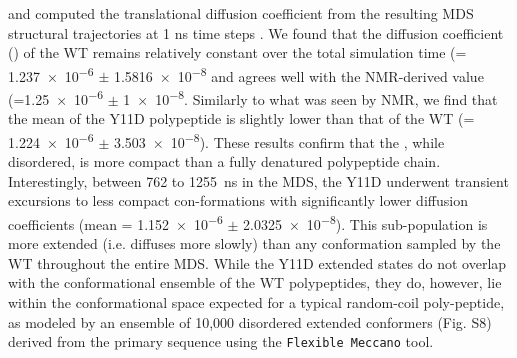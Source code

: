  and computed the translational diffusion coefficient from the resulting MDS structural trajectories at 1 ns time steps . We found that the diffusion coefficient (\diffusion) of the WT \gct{} remains relatively constant over the total simulation time (\diffusion = \num{1.237e-6} $\pm$ \SI{1.5816e-8}{\dcunits} and agrees well with the NMR-derived value (\diffusion=\num{1.25e-6} $\pm$  \SI{1e-8}{\dcunits}.  Similarly to what was seen by NMR, we find that the mean \diffusion of the Y11D \gct{} polypeptide is slightly lower than that of the WT \gct{} (\diffusion= \num{1.224e-6} $\pm$ \SI{3.503e-8}{\dcunits}). These results confirm that the \gct{}, while disordered, is more compact than a fully denatured polypeptide chain. Interestingly, between \num{762} to \SI{1255}{\ns} in the MDS, the Y11D \gct{} underwent transient excursions to less compact con-formations with significantly lower diffusion coefficients (mean \diffusion{}= \num{1.152e-6} $\pm$ \SI{2.0325e-8}{\dcunits}). This sub-population is more extended (i.e. diffuses more slowly) than any conformation sampled by the WT \gct{} throughout the entire MDS. While the Y11D \gct{} extended states do not overlap with the conformational ensemble of the WT \gct{} polypeptides, they do, however, lie within the conformational space expected for a typical random-coil poly-peptide, as modeled by an ensemble of 10,000 disordered extended conformers (Fig. S8) derived from the \gct{} primary sequence using the \texttt{Flexible Meccano} tool.  



